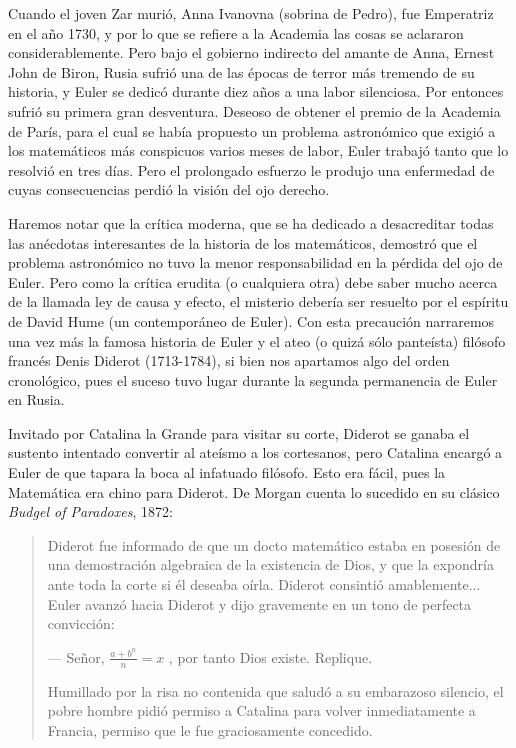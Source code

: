 \documentclass[a4paper, 12pt]{article}
\begin{document}
Cuando el joven Zar murió, Anna Ivanovna (sobrina de Pedro), fue Emperatriz en el año 1730, y por lo que se refiere a la Academia las cosas se aclararon considerablemente. Pero bajo el gobierno indirecto del amante de Anna, Ernest John de Biron, Rusia sufrió una de las épocas de terror más tremendo de su historia, y Euler se dedicó durante diez años a una labor silenciosa. Por entonces sufrió su primera gran desventura. Deseoso de obtener el premio  de la Academia de París, para el cual se había propuesto un problema astronómico que exigió a los matemáticos más conspicuos varios meses de labor, Euler trabajó tanto que lo resolvió en tres días. Pero el prolongado esfuerzo le produjo una enfermedad de cuyas consecuencias perdió la visión del ojo derecho.

Haremos notar que la crítica moderna, que se ha dedicado a desacreditar todas las anécdotas interesantes de la historia de los matemáticos, demostró que el problema astronómico no tuvo la menor responsabilidad en la pérdida del ojo de Euler. Pero como la crítica erudita (o cualquiera otra) debe saber mucho acerca de la llamada ley de causa y efecto, el misterio debería ser resuelto por el espíritu de David Hume (un contemporáneo de Euler). Con esta precaución narraremos una vez más la famosa historia de Euler y el ateo (o quizá sólo panteísta) filósofo francés Denis Diderot (1713-1784), si bien nos apartamos algo del orden cronológico, pues el suceso tuvo lugar durante la segunda permanencia de Euler en Rusia.

Invitado por Catalina la Grande para visitar su corte, Diderot se ganaba el sustento intentado convertir al ateísmo a los cortesanos, pero Catalina encargó a Euler de que tapara la boca al infatuado filósofo. Esto era fácil, pues la Matemática era chino para Diderot. De Morgan cuenta lo sucedido en su clásico {\it Budgel of Paradoxes}, 1872:

\begin{quote}\small

 Diderot fue informado de que un docto matemático estaba en posesión de una demostración algebraica de la existencia de Dios, y que la expondría ante toda la corte si él deseaba oírla. Diderot consintió amablemente... Euler avanzó hacia Diderot y dijo gravemente en un tono de perfecta convicción:

--- Señor, $\displaystyle\frac{a+b^n}{n}=x$ , por tanto Dios existe. Replique.

Humillado por la risa no contenida que saludó a su embarazoso silencio, el pobre hombre pidió permiso a Catalina para volver inmediatamente a Francia, permiso que le fue graciosamente concedido.

\end{quote}
\end{document}
